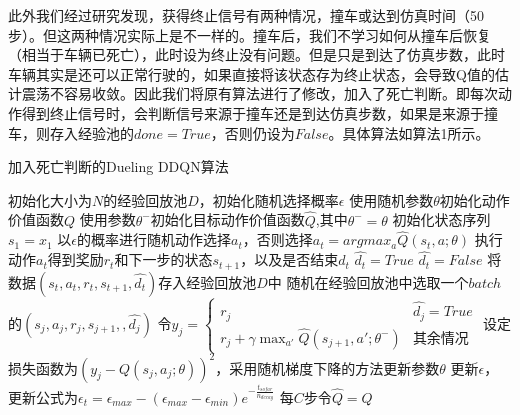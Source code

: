 \documentclass[letterpaper, 10 pt, conference]{ieeeconf}  %
\begin{document}
此外我们经过研究发现，获得终止信号有两种情况，撞车或达到仿真时间（50步）。但这两种情况实际上是不一样的。撞车后，我们不学习如何从撞车后恢复（相当于车辆已死亡），此时设为终止没有问题。但是只是到达了仿真步数，此时车辆其实是还可以正常行驶的，如果直接将该状态存为终止状态，会导致Q值的估计震荡不容易收敛。因此我们将原有算法进行了修改，加入了死亡判断。即每次动作得到终止信号时，会判断信号来源于撞车还是到达仿真步数，如果是来源于撞车，则存入经验池的$done=True$，否则仍设为$False$。具体算法如算法1所示。


\begin{algorithm}[htbp]  
    \caption{加入死亡判断的Dueling DDQN算法}  
    \begin{algorithmic}[1] %
            \State 初始化大小为$N$的经验回放池$D$，初始化随机选择概率$\epsilon$
            \State 使用随机参数$\theta$初始化动作价值函数$Q$
            \State 使用参数$\theta^-$初始化目标动作价值函数$\hat{Q}$,其中$\theta^- = \theta$
                \State 初始化状态序列$s_1={x_1}$
                    \State 以$\epsilon$的概率进行随机动作选择$a_t$，否则选择$a_t = argmax_a \hat{Q}(s_t,a;\theta) $
                    \State 执行动作$a_t$得到奖励$r_t$和下一步的状态$s_{t+1}$，以及是否结束$d_t$
                        \State $\hat{d_t}=True$
                    \Else
                        \State $\hat{d_t}=False$
                    \EndIf
                    \State 将数据$(s_t,a_t,r_t,s_{t+1},\hat{d_t})$存入经验回放池$D$中
                    \State 随机在经验回放池中选取一个$batch$的$(s_j,a_j,r_j,s_{j+1},,\hat{d_j})$
                    \State 令$y_j = 
                    \begin{cases}
                        r_j      &  \hat{d_j}=True \\
                        r_j+\gamma \max_{a'} \hat{Q}(s_{j+1},a';\theta^-)   & \mbox{其余情况}
                      \end{cases}
                    $
                    \State 设定损失函数为$(y_j-Q(s_j,a_j;\theta))^2$，采用随机梯度下降的方法更新参数$\theta$
                    \State 更新$\epsilon$，更新公式为$\epsilon_t =\epsilon_{max} - (\epsilon_{max}-\epsilon_{min})e^{-\frac{t_{sofar}}{n_{decay}}}$
                    \State 每$C$步令$\hat{Q} = Q$
                \EndFor
            \EndFor
    \end{algorithmic}  
\end{algorithm} 
\end{document}
